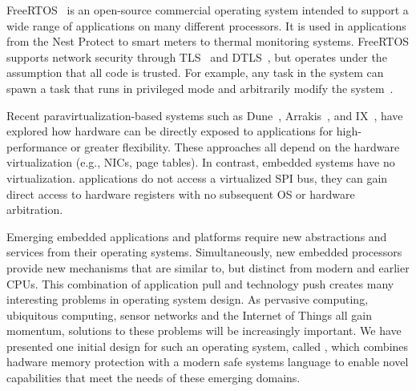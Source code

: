 FreeRTOS~\cite{freertos} is an open-source commercial operating system intended to
support a wide range of applications on many different processors. It
is used in applications from the Nest Protect to smart meters to
thermal monitoring systems. FreeRTOS supports network security
through TLS~\cite{tls} and DTLS~\cite{dtls}, but operates under the
assumption that all code is trusted. For example, any task in the system
can spawn a task that runs in privileged mode and arbitrarily modify
the system~\cite{rtos-tasks,rtos-sec}.

Recent paravirtualization-based systems such as Dune~\cite{dune:osdi2012},
 Arrakis~\cite{arrakis:osdi2014}, and IX~\cite{ix:osdi2014}, have explored how hardware can
be directly exposed to applications for high-performance or greater
flexibility. These approaches all depend on the hardware virtualization (e.g.,
NICs, page tables). In contrast, embedded
systems have no virtualization. \name applications do not access a virtualized
SPI bus, they can gain direct access to hardware registers with no subsequent
OS or hardware arbitration.

Emerging embedded applications and platforms require new abstractions and
services from their operating systems. Simultaneously, new embedded processors
provide new mechanisms that are similar to, but distinct from modern and
earlier CPUs. This combination of application pull and technology push
creates many interesting problems in operating system design. As pervasive
computing, ubiquitous computing, sensor networks and the Internet of Things
all gain momentum, solutions to these problems will be increasingly 
important. We have presented one initial design for such an operating system,
called \name, which combines hadware memory protection with a modern
safe systems language to enable novel capabilities that meet the needs
of these emerging domains.

